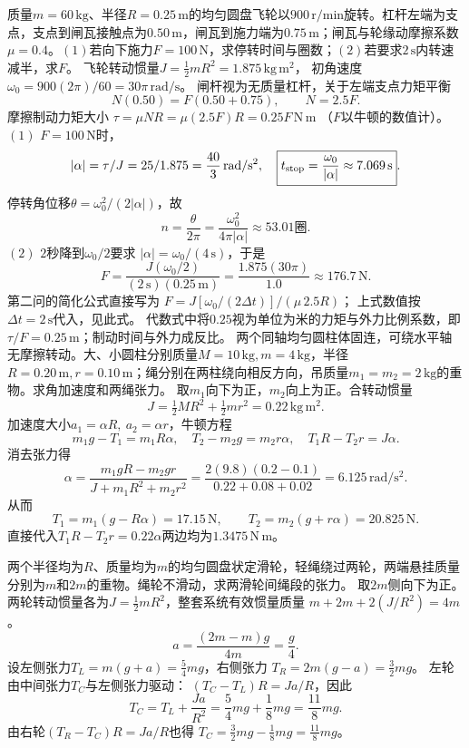 \problemtext 质量$m=60\,\mathrm{kg}$、半径$R=0.25\,\mathrm m$的均匀圆盘飞轮以$900\,\mathrm{r/min}$旋转。杠杆左端为支点，支点到闸瓦接触点为$0.50\,\mathrm m$，闸瓦到施力端为$0.75\,\mathrm m$；闸瓦与轮缘动摩擦系数$\mu=0.4$。$(1)$若向下施力$F=100\,\mathrm N$，求停转时间与圈数；$(2)$若要求$2\,\mathrm s$内转速减半，求$F$。
\workings
飞轮转动惯量$J=\frac12mR^2=1.875\,\mathrm{kg\,m^2}$，
初角速度$\omega_0=900(2\pi)/60=30\pi\,\mathrm{rad/s}$。
闸杆视为无质量杠杆，关于左端支点力矩平衡
\[
N(0.50)=F(0.50+0.75),\qquad N=2.5F.
\]
摩擦制动力矩大小
$\tau=\mu NR=\mu(2.5F)R=0.25F\,\mathrm{N\,m}$
（$F$以牛顿的数值计）。
$(1)$ $F=100\,\mathrm N$时，
\[
|\alpha|=\tau/J=25/1.875=\frac{40}{3}\,\mathrm{rad/s^2},
\quad
\boxed{t_{\rm stop}=\frac{\omega_0}{|\alpha|}
\approx7.069\,\mathrm s}.
\]
停转角位移$\theta=\omega_0^2/(2|\alpha|)$，故
\[
\boxed{n=\frac{\theta}{2\pi}
=\frac{\omega_0^2}{4\pi|\alpha|}
\approx53.01\text{圈}}.
\]
$(2)$ $2$秒降到$\omega_0/2$要求
$|\alpha|=\omega_0/(4\,\mathrm s)$，于是
\[
\boxed{F=\frac{J(\omega_0/2)}{(2\,\mathrm s)(0.25\,\mathrm m)}
=\frac{1.875(30\pi)}{1.0}
\approx176.7\,\mathrm N}.
\]
\crosscheck 第二问的简化公式直接写为
$F=J[\omega_0/(2\Delta t)]/(\mu\,2.5R)$；
上式数值按$\Delta t=2\,\mathrm s$代入，见此式。
代数式中将$0.25$视为单位为米的力矩与外力比例系数，即$\tau/F=0.25\,\mathrm m$；制动时间与外力成反比。
\problemtext 两个同轴均匀圆柱体固连，可绕水平轴无摩擦转动。大、小圆柱分别质量$M=10\,\mathrm{kg},m=4\,\mathrm{kg}$，半径$R=0.20\,\mathrm m,r=0.10\,\mathrm m$；绳分别在两柱绕向相反方向，吊质量$m_1=m_2=2\,\mathrm{kg}$的重物。求角加速度和两绳张力。
\workings
取$m_1$向下为正，$m_2$向上为正。合转动惯量
\[
J=\tfrac12MR^2+\tfrac12mr^2=0.22\,\mathrm{kg\,m^2}.
\]
加速度大小$a_1=\alpha R,\ a_2=\alpha r$，牛顿方程
\[
m_1g-T_1=m_1R\alpha,\quad
T_2-m_2g=m_2r\alpha,\quad
T_1R-T_2r=J\alpha.
\]
消去张力得
\[
\boxed{\alpha=\frac{m_1gR-m_2gr}
{J+m_1R^2+m_2r^2}
=\frac{2(9.8)(0.2-0.1)}{0.22+0.08+0.02}
=6.125\,\mathrm{rad/s^2}}.
\]
从而
\[
\boxed{T_1=m_1(g-R\alpha)=17.15\,\mathrm N},\qquad
\boxed{T_2=m_2(g+r\alpha)=20.825\,\mathrm N}.
\]
\crosscheck 直接代入$T_1R-T_2r=0.22\alpha$两边均为$1.3475\,\mathrm{N\,m}$。

\problemtext 两个半径均为$R$、质量均为$m$的均匀圆盘状定滑轮，轻绳绕过两轮，两端悬挂质量分别为$m$和$2m$的重物。绳轮不滑动，求两滑轮间绳段的张力。
\workings
取$2m$侧向下为正。两轮转动惯量各为$J=\frac12mR^2$，整套系统有效惯量质量
$m+2m+2(J/R^2)=4m$。
\[
a=\frac{(2m-m)g}{4m}=\frac g4.
\]
设左侧张力$T_L=m(g+a)=\frac54mg$，右侧张力
$T_R=2m(g-a)=\frac32mg$。
左轮由中间张力$T_C$与左侧张力驱动：
$(T_C-T_L)R=Ja/R$，因此
\[
\boxed{T_C=T_L+\frac{Ja}{R^2}
=\frac54mg+\frac18mg=\frac{11}{8}mg}.
\]
\crosscheck 由右轮$(T_R-T_C)R=Ja/R$也得
$T_C=\frac32mg-\frac18mg=\frac{11}{8}mg$。

